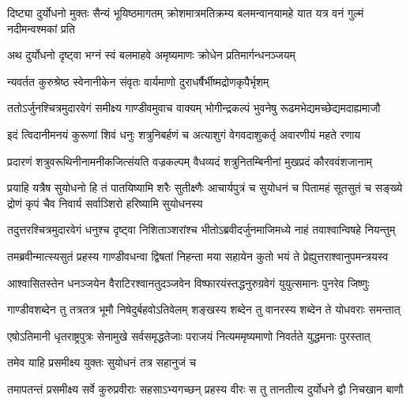 


\threelineshloka
{दिष्ट्या दुर्योधनो मुक्तः सैन्यं भूयिष्ठमागतम्}
{क्रोशमात्रमतिक्रम्य बलमन्वानयामहे}
{यात यत्र वनं गुल्मं नदीमन्वश्मकां प्रति}



\twolineshloka
{अथ दुर्योधनो दृष्ट्वा भग्नं स्वं बलमाहवे}
{अमृष्यमाणः क्रोधेन प्रतिमार्गन्धनञ्जयम्}


\twolineshloka
{न्यवर्तत कुरुश्रेष्ठ स्वेनानीकेन संवृतः}
{वार्यमाणो दुराधर्षैर्भीष्मद्रोणकृपैर्भृशम्}


\twolineshloka
{ततोऽर्जुनश्चित्रमुदारवेगं समीक्ष्य गाण्डीवमुवाच वाक्यम्}
{भोगीन्द्रकल्पं भुवनेषु रूढमभेद्यमच्छेद्यमदाह्यमाजौ}


\twolineshloka
{इदं त्विदानीमनयं कुरूणां शिवं धनुः शत्रुनिबर्हणं च}
{अत्याशुगं वेगवदाशुकर्तृ अवारणीयं महते रणाय}


\twolineshloka
{प्रदारणं शत्रुवरूथिनीनामनीकजित्संयति वज्रकल्पम्}
{वैधव्यदं शत्रुनितम्बिनीनां मुखप्रदं कौरववंशजानाम्}


\threelineshloka
{प्रयाहि यत्रैष सुयोधनो हि तं पातयिष्यामि शरैः सुतीक्ष्णैः}
{आचार्यपुत्रं च सुयोधनं च पितामहं सूतसुतं च सङ्ख्ये}
{द्रोणं कृपं चैव निवार्य सर्वाञ्शिरो हरिष्यामि सुयोधनस्य}



\twolineshloka
{तदुत्तरश्चित्रमुदारवेगं धनुश्च दृष्ट्वा निशिताञ्शरांश्च}
{भीतोऽब्रवीदर्जुनमाजिमध्ये नाहं तवाश्वान्विषहे नियन्तुम्}


\twolineshloka
{तमब्रवीन्मात्स्यसुतं प्रहस्य गाण्डीवधन्वा द्विषतां निहन्ता}
{मया सहायेन कुतो भयं ते प्रेह्युत्तराश्वानुपमन्त्रयस्व}


\twolineshloka
{आश्वासितस्तेन धनञ्जयेन वैराटिरश्वानतुदञ्जवेन}
{विष्फारयंस्तद्धनुरुग्रवेगं युयुत्समानः पुनरेव जिष्णुः}


\twolineshloka
{गाण्डीवशब्देन तु तत्रतत्र भूमौ निषेदुर्बहवोऽतिवेलम्}
{शङ्खस्य शब्देन तु वानरस्य शब्देन ते योधवराः समन्तात्}




\twolineshloka
{एषोऽतिमानी धृतराष्ट्रपुत्रः सेनामुखे सर्वसमृद्धतेजाः}
{पराजयं नित्यममृष्यमाणो निवर्तते युद्धमनाः पुरस्तात्}


\onelineshloka
{तमेव याहि प्रसमीक्ष्य युक्तः सुयोधनं तत्र सहानुजं च}



\twolineshloka
{तमापतन्तं प्रसमीक्ष्य सर्वे कुरुप्रवीराः सहसाऽभ्यगच्छन्}
{प्रहस्य वीरः स तु तानतीत्य दुर्योधने द्वौ निचखान बाणौ}


